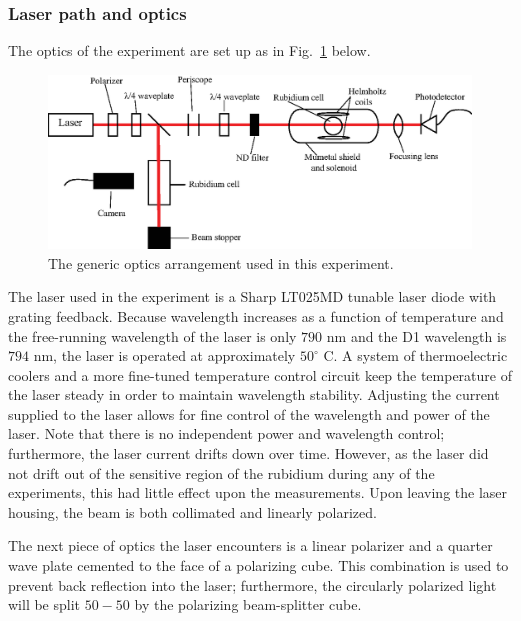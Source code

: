 \subsubsection{Laser path and optics}

The optics of the experiment are set up as in Fig.~\ref{fig:optics1} below.

\begin{figure}[htbp]
\begin{center}
\includegraphics[width=6.5in]{./figures/optics1.eps}
\caption{\small{The generic optics arrangement used in this experiment.}}
\label{fig:optics1}
\end{center}
\end{figure}


The laser used in the experiment is a Sharp LT025MD tunable laser diode with grating feedback. Because wavelength increases as a function of temperature and the free-running wavelength of the laser is only $790$ nm and the D1 wavelength is $794$ nm, the laser is operated at approximately $50^{\circ}$ C. A system of thermoelectric coolers and a more fine-tuned temperature control circuit keep the temperature of the laser steady in order to maintain wavelength stability. Adjusting the current supplied to the laser allows for fine control of the wavelength and power of the laser. Note that there is no independent power and wavelength control; furthermore, the laser current drifts down over time. However, as the laser did not drift out of the sensitive region of the rubidium during any of the experiments, this had little effect upon the measurements. Upon leaving the laser housing, the beam is both collimated and linearly polarized.

The next piece of optics the laser encounters is a linear polarizer and a quarter wave plate cemented to the face of a polarizing cube. This combination is used to prevent back reflection into the laser; furthermore, the circularly polarized light will be split $50-50$ by the polarizing beam-splitter cube. 

